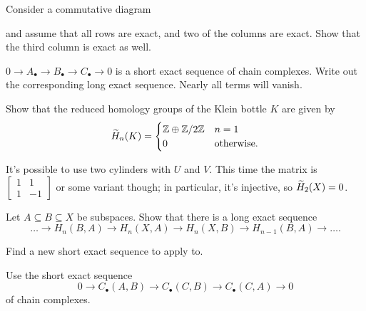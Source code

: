 \begin{problem}
	Consider a commutative diagram
	\begin{center}
	\end{center}
	and assume that all rows are exact,
	and two of the columns are exact.
	Show that the third column is exact as well.
	\begin{hint}
		$0 \to A_\bullet \to B_\bullet \to C_\bullet \to 0$
		is a short exact sequence of chain complexes.
		Write out the corresponding long exact sequence.
		Nearly all terms will vanish.
	\end{hint}
\end{problem}

\begin{sproblem}
	\gim
	Show that the reduced homology groups of the Klein bottle $K$ are given by
	\[
		\widetilde H_n(K) = 
		\begin{cases}
			\mathbb Z \oplus \mathbb Z/2\mathbb Z & n = 1 \\
			0 & \text{otherwise}.
		\end{cases}
	\]
	\begin{hint}
		It's possible to use two cylinders with $U$ and $V$.
		This time the matrix is $\begin{bmatrix} 1 & 1 \\ 1 & -1 \end{bmatrix}$
		or some variant though; in particular, it's injective, so $\widetilde H_2(X) = 0$.
	\end{hint}
\end{sproblem}

\begin{sproblem}
	\label{prob:triple_long_exact}
	Let $A \subseteq B \subseteq X$ be subspaces.
	Show that there is a long exact sequence
	\[
		\dots \to H_n(B,A) \to H_n(X,A)
		\to H_n(X,B) \to H_{n-1}(B,A) \to \dots.
	\]
	\begin{hint}
		Find a new short exact sequence
		to apply  to.
	\end{hint}
	\begin{sol}
		Use the short exact sequence
		\[ 0 \to C_\bullet(A,B) \to C_\bullet(C,B) \to C_\bullet(C,A) \to 0 \]
		of chain complexes.
	\end{sol}
\end{sproblem}
